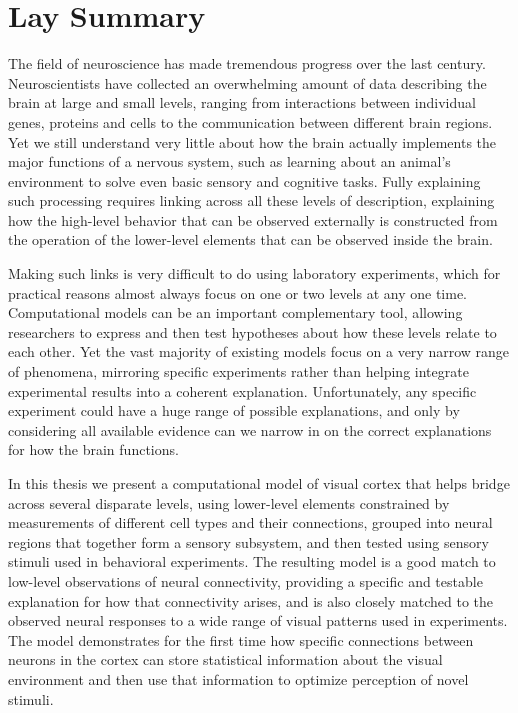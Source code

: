 
\begingroup
\let\clearpage\relax
\let\cleardoublepage\relax
\let\cleardoublepage\relax

\chapter*{Lay Summary} %
The field of neuroscience has made tremendous progress over the last
century.  Neuroscientists have collected an overwhelming amount of
data describing the brain at large and small levels, ranging from
interactions between individual genes, proteins and cells to the
communication between different brain regions. Yet we still understand
very little about how the brain actually implements the major
functions of a nervous system, such as learning about an animal's
environment to solve even basic sensory and cognitive tasks.  Fully
explaining such processing requires linking across all these levels of
description, explaining how the high-level behavior that can be
observed externally is constructed from the operation of the
lower-level elements that can be observed inside the brain.

Making such links is very difficult to do using laboratory
experiments, which for practical reasons almost always focus on one or
two levels at any one time.  Computational models can be an important
complementary tool, allowing researchers to express and then test
hypotheses about how these levels relate to each other.  Yet the vast
majority of existing models focus on a very narrow range of phenomena,
mirroring specific experiments rather than helping integrate
experimental results into a coherent explanation.  Unfortunately, any
specific experiment could have a huge range of possible explanations,
and only by considering all available evidence can we narrow in on the
correct explanations for how the brain functions.

In this thesis we present a computational model of visual cortex that
helps bridge across several disparate levels, using lower-level
elements constrained by measurements of different cell types and their
connections, grouped into neural regions that together form a sensory
subsystem, and then tested using sensory stimuli used in behavioral
experiments.  The resulting model is a good match to low-level
observations of neural connectivity, providing a specific and testable
explanation for how that connectivity arises, and is also closely
matched to the observed neural responses to a wide range of visual
patterns used in experiments.  The model demonstrates for the first
time how specific connections between neurons in the cortex can store
statistical information about the visual environment and then use that
information to optimize perception of novel stimuli.

